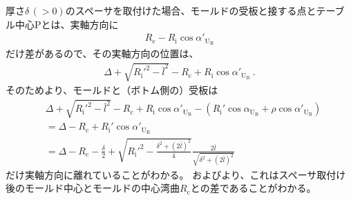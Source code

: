 厚さ$\delta\,(>0)$のスペーサを取付けた場合、モールドの受板と接する点とテーブル中心Pとは、実軸方向に
\begin{align*}
  R_\mathrm c-R_\mathrm i\cos\alpha'_{\mathrm U_\mathrm B}
\end{align*}
だけ差があるので、その実軸方向の位置は、
\begin{align*}
  \varDelta+\sqrt{R_\mathrm i'^2-\bar l^2}-R_\mathrm c+R_\mathrm i\cos\alpha'_{\mathrm U_\mathrm B}\ .
\end{align*}
そのためより、モールドと（ボトム側の）受板は
\begin{align*}
  &  \varDelta+\sqrt{R_\mathrm i'^2-\bar l^2}-R_\mathrm c+R_\mathrm i\cos\alpha'_{\mathrm U_\mathrm B}
     -\left(R_\mathrm i'\cos\alpha_{\mathrm U_\mathrm B}+\rho\cos\alpha'_{\mathrm U_\mathrm B}\right)\\
  &= \varDelta-R_\mathrm c+R_\mathrm i'\cos\alpha'_{\mathrm U_\mathrm B}\\
  &= \varDelta-R_\mathrm c
     -\frac\delta2+\sqrt{R_\mathrm i'^2-\frac{\delta^2+(2\bar l)^2}4}\frac{2\bar l}{\sqrt{\delta^2+(2\bar l)^2}}
\end{align*}
だけ実軸方向に離れていることがわかる。
およびより、これはスペーサ取付け後のモールド中心とモールドの中心湾曲$R_\mathrm c$との差であることがわかる。
